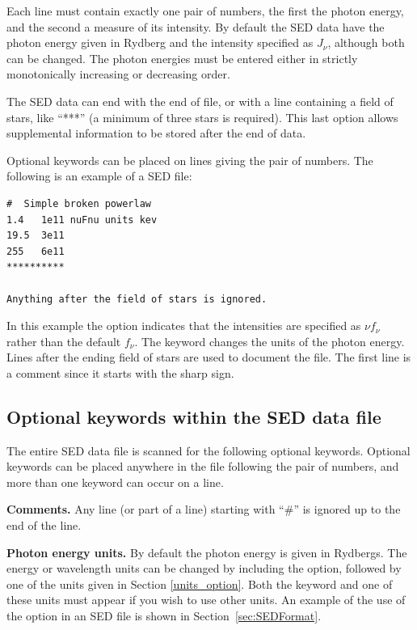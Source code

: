 Each line must contain exactly one pair of numbers, the first the photon energy, and the second a
measure of its intensity.
By default the SED data have the photon energy given in Rydberg
and the intensity specified as $J_\nu$, although both can be changed.
The photon energies must be entered either in strictly monotonically increasing
or decreasing order.

The SED data can end with the end of file, or with a line containing a field
of stars, like ``***'' (a minimum of three stars is required).
This last option allows supplemental information to be stored after the end of data.

Optional keywords can be placed on lines giving the pair of numbers.  The following
is an example of a SED file:

\begin{verbatim}
#  Simple broken powerlaw
1.4   1e11 nuFnu units kev 
19.5  3e11 
255   6e11
**********

Anything after the field of stars is ignored.
\end{verbatim}

\noindent
In this example the  option indicates that the intensities are specified as $\nu f_\nu$
rather than the default $f_\nu$.
The  keyword changes the units of the photon energy.
Lines after the ending field of stars are used to document the file.
The first line is a comment since it starts with the sharp sign.

\subsection{Optional keywords within the SED data file}

The entire SED data file is scanned for the following optional keywords.
Optional keywords can be placed anywhere in the file following the pair of numbers, and
more than one keyword can occur on a line.

\textbf{Comments.}
Any line (or part of a line) starting with ``\#'' is ignored up to the end of the line.

\textbf{Photon energy units.}
By default the photon energy is given in Rydbergs.
The energy or wavelength units can be changed by including
the  option, followed by one of the units given
in Section \ref{units_option}. 
Both the keyword  and one of
these units must appear if you wish to use other units. 
An example of the use
of the  option in an SED file is shown in Section~\ref{sec:SEDFormat}.


